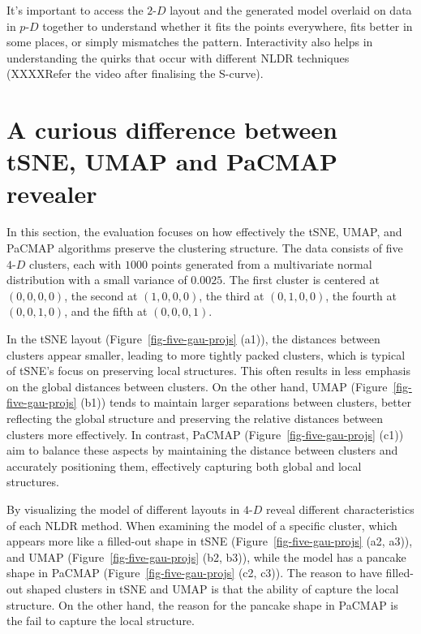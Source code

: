 \documentclass[
  12pt]{article}
\newcommand\pD{$p\text{-}D$}
\newcommand\gD{$2\text{-}D$}
\begin{document}
It's important to access the \gD{} layout and the generated model
overlaid on data in \pD{} together to understand whether it fits the
points everywhere, fits better in some places, or simply mismatches the
pattern. Interactivity also helps in understanding the quirks that occur
with different NLDR techniques (XXXXRefer the video after finalising the
S-curve).

\section{A curious difference between tSNE, UMAP and PaCMAP
revealer}\label{a-curious-difference-between-tsne-umap-and-pacmap-revealer}

In this section, the evaluation focuses on how effectively the tSNE,
UMAP, and PaCMAP algorithms preserve the clustering structure. The data
consists of five \(4\text{-}D\) clusters, each with \(1000\) points
generated from a multivariate normal distribution with a small variance
of \(0.0025\). The first cluster is centered at \((0, 0, 0, 0)\), the
second at \((1, 0, 0, 0)\), the third at \((0, 1, 0, 0)\), the fourth at
\((0, 0, 1, 0)\), and the fifth at \((0, 0, 0, 1)\).

In the tSNE layout (Figure~\ref{fig-five-gau-projs} (a1)), the distances
between clusters appear smaller, leading to more tightly packed
clusters, which is typical of tSNE's focus on preserving local
structures. This often results in less emphasis on the global distances
between clusters. On the other hand, UMAP
(Figure~\ref{fig-five-gau-projs} (b1)) tends to maintain larger
separations between clusters, better reflecting the global structure and
preserving the relative distances between clusters more effectively. In
contrast, PaCMAP (Figure~\ref{fig-five-gau-projs} (c1)) aim to balance
these aspects by maintaining the distance between clusters and
accurately positioning them, effectively capturing both global and local
structures.

By visualizing the model of different layouts in \(4\text{-}D\) reveal
different characteristics of each NLDR method. When examining the model
of a specific cluster, which appears more like a filled-out shape in
tSNE (Figure~\ref{fig-five-gau-projs} (a2, a3)), and UMAP
(Figure~\ref{fig-five-gau-projs} (b2, b3)), while the model has a
pancake shape in PaCMAP (Figure~\ref{fig-five-gau-projs} (c2, c3)). The
reason to have filled-out shaped clusters in tSNE and UMAP is that the
ability of capture the local structure. On the other hand, the reason
for the pancake shape in PaCMAP is the fail to capture the local
structure.
\end{document}
